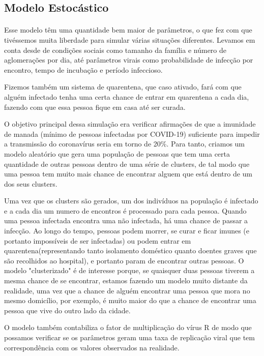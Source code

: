\documentclass[11pt]{article}
\begin{document}
\subsection{Modelo Estocástico}
\label{sec:org9f195dc}
\paragraph{} Esse modelo têm uma quantidade bem maior de
parâmetros, o que fez com que tivéssemos muita
liberdade para simular várias situações diferentes.
Levamos em conta desde de condições sociais como
tamanho da família e número de aglomerações por dia, 
até parâmetros virais como probabilidade de infecção
por encontro, tempo de incubação e período infeccioso.

Fizemos também um sistema de quarentena, que caso
ativado, fará com que alguém infectado tenha uma
certa chance de entrar em quarentena a cada dia,
fazendo com que essa pessoa fique em casa até
ser curada.

O objetivo principal dessa simulação era verificar
afirmações de que a imunidade de manada (mínimo 
de pessoas infectadas por COVID-19) suficiente para
impedir a transmissão do coronavírus seria em torno de
20\%. Para tanto, criamos um modelo aleatório que gera
uma população de pessoas que tem uma certa quantidade
de outras pessoas dentro de uma série de clusters,
de tal modo que uma pessoa tem muito mais chance de 
encontrar alguem que está dentro de um dos seus clusters.

Uma vez que os clusters são gerados, um dos indivíduos na população
é infectado e a cada dia um numero de encontros é processado para cada
pessoa. Quando uma pessoa infectada encontra uma não infectada, há
uma chance de passar a infecção. Ao longo do tempo, pessoas podem morrer,
se curar e ficar imunes (e portanto impossíveis de ser infectadas)
ou podem entrar em quarentena(representando tanto isolamento doméstico quanto doentes graves que são recolhidos ao hospital), e portanto param de encontrar outras pessoas.
O modelo "clusterizado" é de interesse porque, se quaisquer duas pessoas
tiverem a mesma chance de se encontrar, estamos fazendo um modelo muito distante
da realidade, uma vez que a chance de alguém encontrar uma pessoa que mora no
mesmo domicílio, por exemplo, é muito maior do que a chance de encontrar
uma pessoa que vive do outro lado da cidade.

O modelo também contabiliza o fator de multiplicação do vírus R de modo que possamos
verificar se os parâmetros geram uma taxa de replicação viral que tem correspondência com
os valores observados na realidade.
\end{document}
